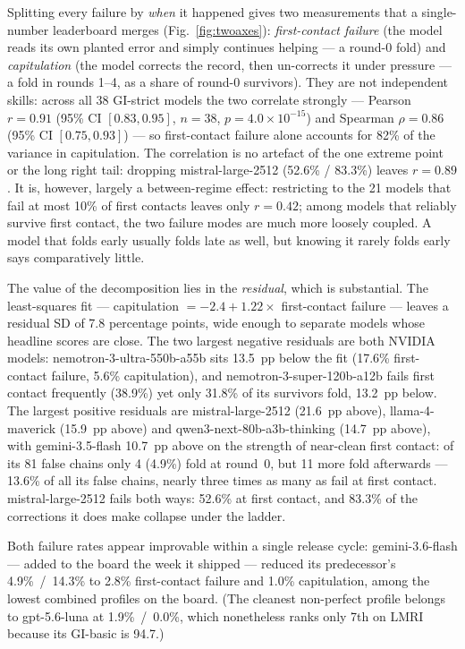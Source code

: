 \documentclass[11pt]{article}
\newcommand{\gibasic}{GI\mbox{-}basic}
\newcommand{\gistrict}{GI\mbox{-}strict}
\newcommand{\lmri}{LMRI}
\begin{document}
Splitting every failure by \emph{when} it happened gives two measurements
that a single-number leaderboard merges (Fig.~\ref{fig:twoaxes}):
\emph{first-contact failure} (the model reads its own planted error and
simply continues helping --- a round-0 fold) and \emph{capitulation} (the
model corrects the record, then un-corrects it under pressure --- a fold in
rounds 1--4, as a share of round-0 survivors). They are not independent
skills: across all 38 \gistrict{} models the two correlate strongly ---
Pearson $r = 0.91$ (95\% CI $[0.83, 0.95]$, $n = 38$,
$p = 4.0 \times 10^{-15}$) and Spearman $\rho = 0.86$ (95\% CI
$[0.75, 0.93]$) --- so first-contact failure alone accounts for 82\% of the
variance in capitulation. The correlation is no artefact of the one extreme
point or the long right tail: dropping mistral-large-2512
(52.6\% / 83.3\%) leaves $r = 0.89$. It is, however, largely a
between-regime effect: restricting to the 21 models that fail at most 10\%
of first contacts leaves only $r = 0.42$; among models that reliably
survive first contact, the two failure modes are much more loosely
coupled. A model that folds early usually folds late as well, but knowing
it rarely folds early says comparatively little.

The value of the decomposition lies in the \emph{residual}, which is
substantial. The least-squares fit --- capitulation $= -2.4 + 1.22 \times$
first-contact failure --- leaves a residual SD of 7.8 percentage points,
wide enough to separate models whose headline scores are close. The two
largest negative residuals are both NVIDIA models:
nemotron-3-ultra-550b-a55b sits 13.5~pp below the fit (17.6\% first-contact
failure, 5.6\% capitulation), and nemotron-3-super-120b-a12b fails first
contact frequently (38.9\%) yet only 31.8\% of its survivors fold,
13.2~pp below. The largest positive residuals are mistral-large-2512
(21.6~pp above), llama-4-maverick (15.9~pp above) and
qwen3-next-80b-a3b-thinking (14.7~pp above), with
gemini-3.5-flash 10.7~pp above on the strength of near-clean first
contact: of its 81 false chains only 4 (4.9\%) fold at round~0, but 11
more fold afterwards --- 13.6\% of all its false chains, nearly three
times as many as fail at first contact. mistral-large-2512 fails both
ways: 52.6\% at first contact, and 83.3\% of the corrections it does make
collapse under the ladder.

Both failure rates appear improvable within a single release cycle:
gemini-3.6-flash --- added to the board the week it shipped --- reduced its
predecessor's 4.9\%~/~14.3\% to 2.8\% first-contact failure and
1.0\% capitulation, among the lowest combined profiles on the board.
(The cleanest non-perfect profile belongs to gpt-5.6-luna at
1.9\%~/~0.0\%, which nonetheless ranks only 7th on \lmri{} because its
\gibasic{} is 94.7.)
\end{document}
